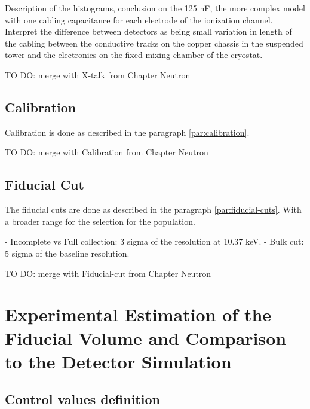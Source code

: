 {\color{red} Description of the histograms, conclusion on the 125 nF, the more complex model with one cabling capacitance for each electrode of the ionization channel.
Interpret the difference between detectors as being small variation in length of the cabling between the conductive tracks on the copper chassis in the suspended tower and the electronics on the fixed mixing chamber of the cryostat.

TO DO: merge with X-talk from Chapter Neutron
}


\subsection{Calibration}

{\color{red} Calibration is done as described in the paragraph \ref{par:calibration}.

TO DO: merge with Calibration from Chapter Neutron}



\subsection{Fiducial Cut}


{\color{red} The fiducial cuts are done as described in the paragraph \ref{par:fiducial-cuts}. With a broader range for the selection for the population.

- Incomplete vs Full collection: 3 sigma of the resolution at 10.37 keV.
- Bulk cut: 5 sigma of the baseline resolution.

TO DO: merge with Fiducial-cut from Chapter Neutron
}


\section{Experimental Estimation of the Fiducial Volume and Comparison to the Detector Simulation}

\subsection{Control values definition}

